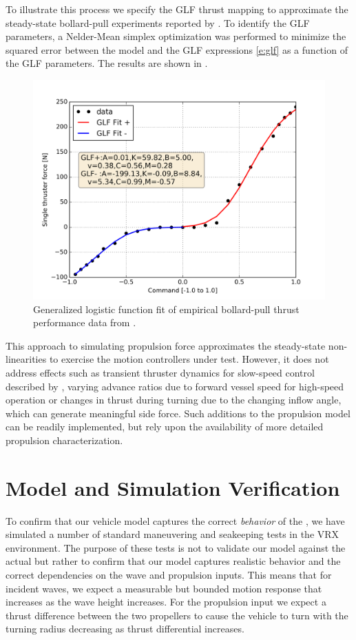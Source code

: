 \documentclass[utf8]{frontiersSCNS} %
\begin{document}
To illustrate this process we specify the GLF thrust mapping to approximate the  steady-state bollard-pull experiments reported by \citet{sarda16station}.  To identify the GLF parameters, a Nelder-Mean simplex optimization was performed to minimize the squared error between the model and the GLF expressions \eqref{e:glf} as a function of the GLF parameters.  The results are shown in .
\begin{figure}[h]
  \centering
  \includegraphics[width=\SFc\textwidth]{images/wamv_glf_annote2.png}
  \caption{Generalized logistic function fit of empirical  bollard-pull thrust performance data from \citep{sarda16station}.}
  \label{f:fit}
\end{figure}

This approach to simulating propulsion force approximates the steady-state non-linearities to exercise the motion controllers under test.  However, it does not address effects such as transient thruster dynamics for slow-speed control described by \citet{whitcomb99development}, varying advance ratios due to forward vessel speed for high-speed operation or changes in thrust during turning due to the changing inflow angle, which can generate meaningful side force.  Such additions to the propulsion model can be readily implemented, but rely upon the availability of more detailed propulsion characterization.
%
\color{red}
\section{Model and Simulation Verification}
%
To confirm that our vehicle model captures the correct \emph{behavior} of the \wamv{}, we have simulated a number of standard maneuvering and seakeeping tests in the VRX environment. The purpose of these tests is not to validate our model against the actual \wamv{} but rather to confirm that our model captures realistic behavior and the correct dependencies on the wave and propulsion inputs. This means that for incident waves, we expect a measurable but bounded motion response that increases as the wave height increases. For the propulsion input we expect a thrust difference between the two propellers to cause the vehicle to turn with the turning radius decreasing as thrust differential increases.
\end{document}
